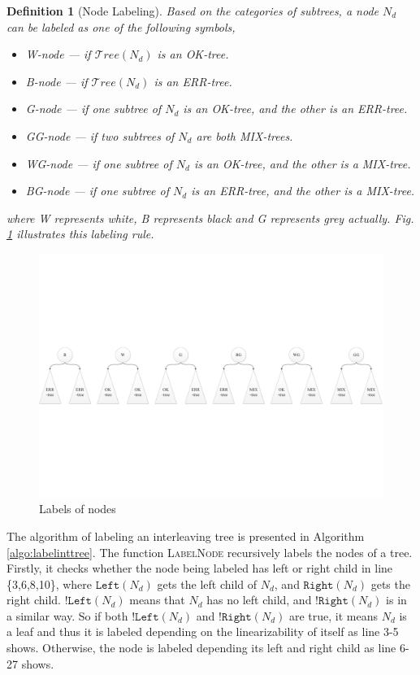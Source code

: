 \documentclass[runningheads]{llncs}
\newtheorem{myDef}{Definition}
\begin{document}
\begin{myDef}[Node Labeling]\label{def:nodelabel}
Based on the categories of subtrees, a node $N_d$ can be labeled as one of the following symbols,
\begin{itemize}
  \item \textit{W}-node --- if $\mathcal{T}ree(N_d)$ is an \textit{OK}-tree.
  \item \textit{B}-node --- if $\mathcal{T}ree(N_d)$ is an \textit{ERR}-tree.
  \item \textit{G}-node --- if one subtree of $N_d$ is an \textit{OK}-tree, and the other is an \textit{ERR}-tree.
  \item \textit{GG}-node --- if two subtrees of $N_d$ are both \textit{MIX}-trees.
  \item \textit{WG}-node --- if one subtree of $N_d$ is an \textit{OK}-tree, and the other is a \textit{MIX}-tree.
  \item \textit{BG}-node --- if one subtree of $N_d$ is an \textit{ERR}-tree, and the other is a \textit{MIX}-tree.
\end{itemize}
\noindent where \textit{W} represents \textit{white}, \textit{B} represents \textit{black} and \textit{G} represents \textit{grey} actually. Fig. \ref{fig:labellabelnodes} illustrates this labeling rule.
\end{myDef}

\begin{figure}[!ht]
\centering
\includegraphics[width = 4.7in]{label.pdf}
\caption{Labels of nodes}\label{fig:labellabelnodes}
\end{figure}

The algorithm of labeling an interleaving tree is presented in Algorithm \ref{algo:labelinttree}. The function \textsc{LabelNode} recursively labels the nodes of a tree. Firstly, it checks whether the node being labeled has left or right child in line \{3,6,8,10\}, where $\mathtt{Left}(N_d)$ gets the left child of $N_d$, and $\mathtt{Right}(N_d)$ gets the right child. $!\mathtt{Left}(N_d)$ means that $N_d$ has no left child, and $!\mathtt{Right}(N_d)$ is in a similar way. So if both $!\mathtt{Left}(N_d)$ and $!\mathtt{Right}(N_d)$ are true, it means $N_d$ is a leaf and thus it is labeled depending on the linearizability of itself as line 3-5 shows. Otherwise, the node is labeled depending its left and right child as line 6-27 shows.
\end{document}
